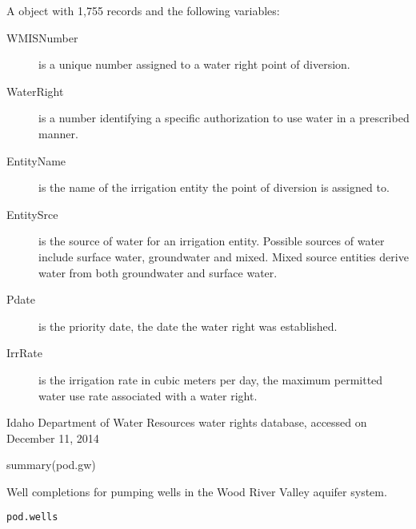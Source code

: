 \documentclass[letterpaper]{book}
\begin{document}
\begin{Format}
A  object with 1,755 records and the following variables:
\begin{description}

\item[WMISNumber] is a unique number assigned to a water right point of diversion.
\item[WaterRight] is a number identifying a specific authorization to use water in a prescribed manner.
\item[EntityName] is the name of the irrigation entity the point of diversion is assigned to.
\item[EntitySrce] is the source of water for an irrigation entity.
Possible sources of water include surface water, groundwater and mixed.
Mixed source entities derive water from both groundwater and surface water.
\item[Pdate] is the priority date, the date the water right was established.
\item[IrrRate] is the irrigation rate in cubic meters per day, the maximum permitted water use rate associated with a water right.

\end{description}

\end{Format}
%
\begin{Source}\relax
Idaho Department of Water Resources water rights database, accessed on December 11, 2014
\end{Source}
%
\begin{SeeAlso}\relax
{}
\end{SeeAlso}
%
\begin{Examples}
\begin{ExampleCode}
summary(pod.gw)
\end{ExampleCode}
\end{Examples}
%
\begin{Description}\relax
Well completions for pumping wells in the Wood River Valley aquifer system.
\end{Description}
%
\begin{Usage}
\begin{verbatim}
pod.wells
\end{verbatim}
\end{Usage}
%
\end{document}
